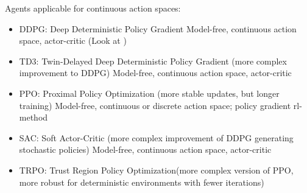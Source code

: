 Agents applicable for continuous action spaces: 
\begin{itemize}		
	\item DDPG: Deep Deterministic Policy Gradient
	Model-free, continuous action space, actor-critic (Look at \parencite{trotta2022walking})
	\item TD3: Twin-Delayed Deep Deterministic Policy Gradient (more complex improvement to DDPG)
	Model-free, continuous action space, actor-critic
	\item PPO: Proximal Policy Optimization (more stable updates, but longer training)
	Model-free, continuous or discrete action space; policy gradient rl-method
	\item SAC: Soft Actor-Critic (more complex improvement of DDPG generating stochastic policies)
	Model-free, continuous action space, actor-critic
	\item TRPO: Trust Region Policy Optimization(more complex version of PPO, more robust for deterministic environments with fewer iterations)
\end{itemize}
